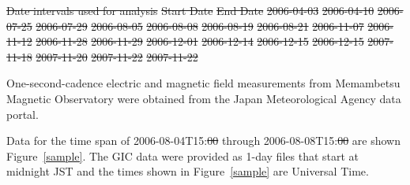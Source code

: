\documentclass[draft,linenumbers]{agujournal2018}
\providecommand{\DIFaddtex}[1]{{\protect\color{blue}\uwave{#1}}} %
\providecommand{\DIFdeltex}[1]{{\protect\color{red}\sout{#1}}}                      %
\providecommand{\DIFaddbegin}{} %
\providecommand{\DIFaddend}{} %
\providecommand{\DIFdelbegin}{} %
\providecommand{\DIFdelend}{} %
\providecommand{\DIFadd}[1]{\texorpdfstring{\DIFaddtex{#1}}{#1}} %
\providecommand{\DIFdel}[1]{\texorpdfstring{\DIFdeltex{#1}}{}} %
\begin{document}
{%
\DIFdel{Date intervals used for analysis}}
\DIFdel{Start Date }%
\DIFdel{End Date}%
\DIFdel{2006-04-03 }%
\DIFdel{2006-04-10}%
\DIFdel{2006-07-25 }%
\DIFdel{2006-07-29}%
\DIFdel{2006-08-05 }%
\DIFdel{2006-08-08}%
\DIFdel{2006-08-19 }%
\DIFdel{2006-08-21}%
\DIFdel{2006-11-07 }%
\DIFdel{2006-11-12}%
\DIFdel{2006-11-28 }%
\DIFdel{2006-11-29}%
\DIFdel{2006-12-01 }%
\DIFdel{2006-12-14}%
\DIFdel{2006-12-15 }%
\DIFdel{2006-12-15}%
\DIFdel{2007-11-18 }%
\DIFdel{2007-11-20}%
\DIFdel{2007-11-22 }%
\DIFdel{2007-11-22}%
\DIFdelend \DIFaddbegin \DIFadd{.
}\DIFaddend 

One-second-cadence electric and magnetic field measurements from Memambetsu Magnetic Observatory were obtained from the Japan Meteorological Agency data portal.

Data for the time span of 2006-08-04T15:\DIFdelbegin \DIFdel{00 }\DIFdelend \DIFaddbegin \DIFadd{00Z }\DIFaddend through 2006-08-08T15:\DIFdelbegin \DIFdel{00 }\DIFdelend \DIFaddbegin \DIFadd{00Z }\DIFaddend are shown Figure~\ref{sample}. The GIC data were provided as 1-day files that start at midnight JST and the times shown in Figure~\ref{sample} are Universal Time.
\end{document}
